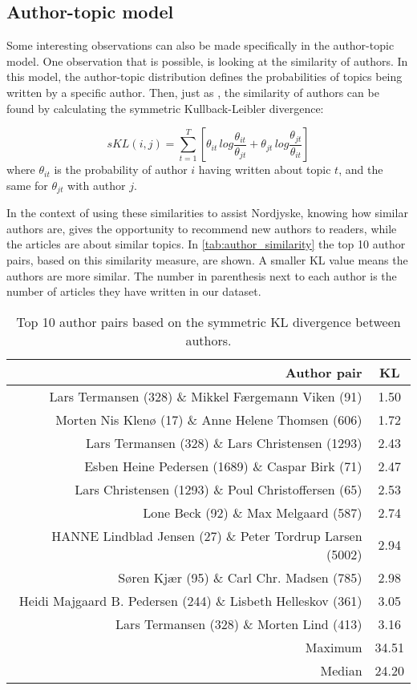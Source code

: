 \subsection{Author-topic model}\label{sec:discussion_author_topic}
Some interesting observations can also be made specifically in the author-topic model.
One observation that is possible, is looking at the similarity of authors.
In this model, the author-topic distribution defines the probabilities of topics being written by a specific author.
Then, just as \citet{author_topic_2012}, the similarity of authors can be found by calculating the symmetric Kullback-Leibler divergence:

\begin{equation}
	sKL(i,j) = \sum_{t=1}^{T}\left[\theta_{it}\, log \frac{\theta_{it}}{\theta_{jt}} + \theta_{jt}\, log \frac{\theta_{jt}}{\theta_{it}}\right]
\end{equation}
\noindent where $\theta_{it}$ is the probability of author $i$ having written about topic $t$, and the same for $\theta_{jt}$ with author $j$.

In the context of using these similarities to assist Nordjyske, knowing how similar authors are, gives the opportunity to recommend new authors to readers, while the articles are about similar topics.
In \autoref{tab:author_similarity} the top 10 author pairs, based on this similarity measure, are shown.
A smaller KL value means the authors are more similar.
The number in parenthesis next to each author is the number of articles they have written in our dataset.

\begin{table}[h]
	\centering
	\caption{Top 10 author pairs based on the symmetric KL divergence between authors.}
	\begin{tabular}{r|c}
		Author pair & KL \\
		\midrule
		Lars Termansen (328) \& Mikkel Færgemann Viken (91) & 1.50 \\
		Morten Nis Klenø (17) \& Anne Helene Thomsen (606) & 1.72 \\
		Lars Termansen (328) \& Lars Christensen (1293) & 2.43 \\
		Esben Heine Pedersen (1689) \& Caspar Birk (71) & 2.47 \\
		Lars Christensen (1293) \& Poul Christoffersen (65) & 2.53 \\
		Lone Beck (92) \& Max Melgaard (587) & 2.74 \\
		HANNE Lindblad Jensen (27) \& Peter Tordrup Larsen (5002) & 2.94 \\
		Søren Kjær (95) \& Carl Chr. Madsen (785) & 2.98 \\
		Heidi Majgaard B. Pedersen (244) \& Lisbeth Helleskov (361) & 3.05 \\
		Lars Termansen (328) \& Morten Lind (413) & 3.16 \\
		\midrule
		Maximum & 34.51 \\
		Median & 24.20 \\
	\end{tabular}
	\label{tab:author_similarity}
\end{table}

